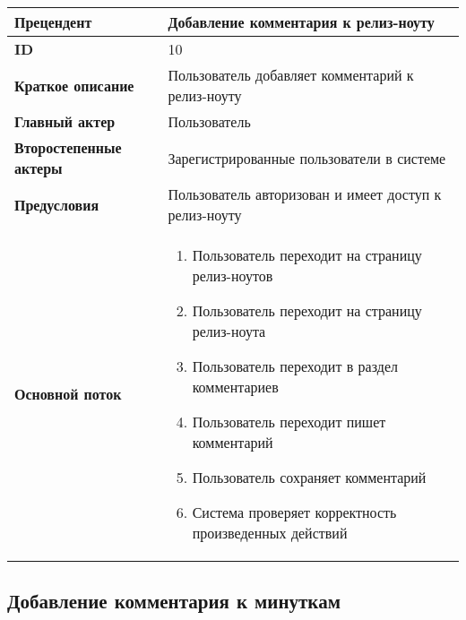 \documentclass[14pt,a4paper]{extarticle}
\begin{document}
\begin{tabular}{|l|p{9cm}|}
	\hline
	\textbf{Прецендент}            & Добавление комментария к релиз-ноуту                                         \\
	\hline
	\textbf{ID}                    & 10                                                                           \\
	\hline
	\textbf{Краткое описание}      & Пользователь добавляет комментарий к релиз-ноуту                	      \\
	\hline
	\textbf{Главный актер}         & Пользователь                                                                 \\
	\hline
	\textbf{Второстепенные актеры} & Зарегистрированные пользователи в системе                                    \\
	\hline 
	\textbf{Предусловия}           & Пользователь авторизован и имеет доступ к релиз-ноуту                        \\
	\hline
	\textbf{Основной поток}        & \begin{enumerate}
		                                 \item Пользователь переходит на страницу релиз-ноутов
		                                 \item Пользователь переходит на страницу релиз-ноута
						 \item Пользователь переходит в раздел комментариев
					         \item Пользователь переходит пишет комментарий
					         \item Пользователь сохраняет комментарий
		                                 \item Система проверяет корректность произведенных действий
	                                 \end{enumerate} \\
	\hline
\end{tabular}

\subsection{Добавление комментария к минуткам}
\end{document}

